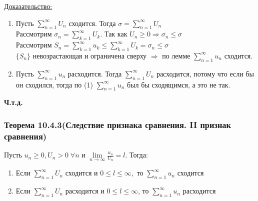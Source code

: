\documentclass[12pt]{article}
\let\oldsum\sum
\let\oldlim\lim
\renewcommand{\sum}{\oldsum\limits}
\renewcommand{\lim}{\oldlim\limits}
\begin{document}
  \underline{Доказательство:}
  \begin{adjustwidth}{1.5em}{1.5em}
    \begin{enumerate}
      \item Пусть $\sum_{n=1}^{\infty} U_n$ сходится. Тогда $\sigma = \sum_{n=1}^{\infty}U_n$\\
      Рассмотрим $\sigma_n = \sum_{k=1}^{\infty} U_k$. Так как $U_n \geq 0 \Rightarrow \sigma_n \leq \sigma$\\
      Рассмотрим $S_n = \sum_{k=1}^{\infty} u_k \leq \sum_{k=1}^{\infty} U_k = \sigma_n \leq \sigma$\\
      $\{S_n\}$ невозрастающая и ограничена сверху $\Rightarrow$ по лемме $\sum_{n=1}^{\infty}u_n$ сходится.
      \item Пусть $\sum_{n=1}^{\infty} u_n$ расходится. Тогда $\sum_{n=1}^{\infty} U_n$ расходится, потому что если бы он 
      сходился, тогда по (1) $\sum_{n=1}^{\infty} u_n$ был бы сходящимся, а  это не так.
    \end{enumerate}
  \end{adjustwidth}
  \begin{center}
    \textbf{Ч.т.д.}
  \end{center}

  \subsubsection*{Теорема 10.4.3(Следствие признака сравнения. II признак сравнения)}\label{th:10.4.3}
  \par\noindent
  Пусть $u_n \geq 0, U_n >0 \; \forall n$ и $\lim_{n \to \infty} \frac{u_n}{U_n} = l$.
  Тогда:
  \begin{enumerate}
    \item Если $\sum_{n=1}^{\infty} U_n$ сходится и $0\leq l \leq \infty,$ то $\sum_{n=1}^{\infty} u_n$ сходится\\
    \item Если $\sum_{n=1}^{\infty} U_n$ расходится и $0\leq l \leq \infty$, то $\sum_{n=1}^{\infty}u_n$ расходится
  \end{enumerate}
\end{document}
